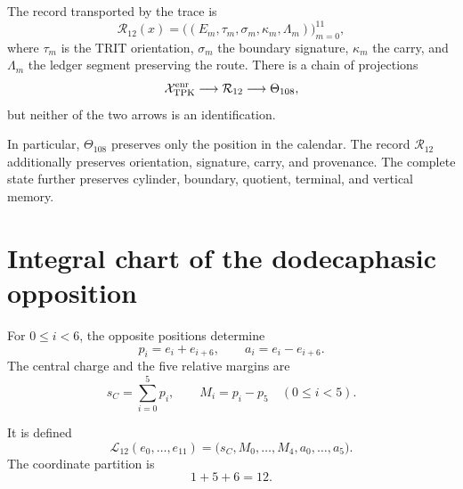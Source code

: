 \begin{definition}
\label{def:registro-enriquecido-dodecafasico}
The record transported by the trace is
\[
 \mathcal R_{12}(x)=
 \bigl((E_m,\tau_m,\sigma_m,\kappa_m,\Lambda_m)\bigr)_{m=0}^{11},
\]
where \(\tau_m\) is the TRIT orientation, \(\sigma_m\) the boundary signature, \(\kappa_m\) the carry, and \(\Lambda_m\) the ledger segment preserving the route. There is a chain of projections
\[
 \mathcal X_{\rm TPK}^{\rm enr}
 \longrightarrow\mathcal R_{12}
 \longrightarrow\Theta_{108},
\]
but neither of the two arrows is an identification.
\end{definition}

In particular, \(\Theta_{108}\) preserves only the position in the calendar.
The record \(\mathcal R_{12}\) additionally preserves orientation, signature,
carry, and provenance. The complete state further preserves cylinder,
boundary, quotient, terminal, and vertical memory.

\section{Integral chart of the dodecaphasic opposition}

For \(0\leq i<6\), the opposite positions determine
\begin{equation}
 p_i=e_i+e_{i+6},
 \qquad
 a_i=e_i-e_{i+6}.
 \label{eq:pares-opuestos-registro}
\end{equation}
The central charge and the five relative margins are
\begin{equation}
 s_C=\sum_{i=0}^{5}p_i,
 \qquad
 M_i=p_i-p_5\quad(0\leq i<5).
 \label{eq:carga-margenes-registro}
\end{equation}

\begin{definition}
\label{def:carta-integral-156}
It is defined
\begin{equation}
 \mathcal L_{12}(e_0,\ldots,e_{11})
 =\bigl(s_C,M_0,\ldots,M_4,a_0,\ldots,a_5\bigr).
 \label{eq:carta-integral-156}
\end{equation}
The coordinate partition is
\[
 1+5+6=12.
\]
\end{definition}

